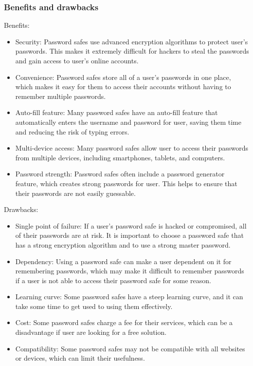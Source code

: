 \documentclass[conference]{IEEEtran}
\begin{document}
\subsubsection{Benefits and drawbacks}
Benefits:
\begin{itemize}
\item Security: Password safes use advanced encryption algorithms to protect user's passwords. This makes it extremely difficult for hackers to steal the passwords and gain access to user's online accounts.
\item Convenience: Password safes store all of a user's passwords in one place, which makes it easy for them to access their accounts without having to remember multiple passwords.
\item Auto-fill feature: Many password safes have an auto-fill feature that automatically enters the username and password for user, saving them time and reducing the risk of typing errors.
\item Multi-device access: Many password safes allow user to access their passwords from multiple devices, including smartphones, tablets, and computers.
\item Password strength: Password safes often include a password generator feature, which creates strong passwords for user. This helps to ensure that their passwords are not easily guessable.
\end{itemize}
Drawbacks:
\begin{itemize}
\item Single point of failure: If a user's password safe is hacked or compromised, all of their passwords are at risk. It is important to choose a password safe that has a strong encryption algorithm and to use a strong master password.
\item Dependency: Using a password safe can make a user dependent on it for remembering passwords, which may make it difficult to remember passwords if a user is not able to access their password safe for some reason.
\item Learning curve: Some password safes have a steep learning curve, and it can take some time to get used to using them effectively.
\item Cost: Some password safes charge a fee for their services, which can be a disadvantage if user are looking for a free solution.
\item Compatibility: Some password safes may not be compatible with all websites or devices, which can limit their usefulness.
\end{itemize}
\end{document}
